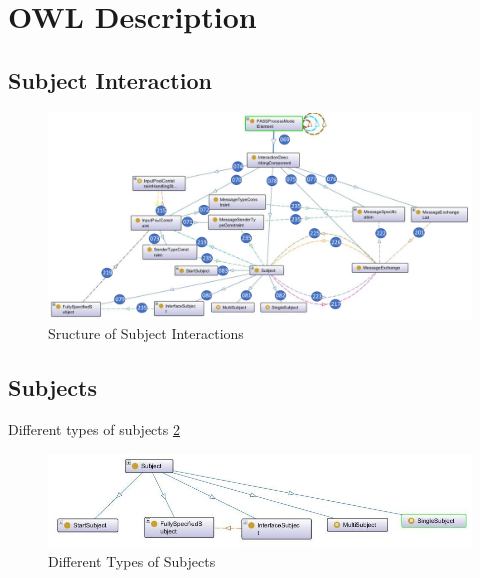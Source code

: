 \newpage

\section{OWL Description}

\subsection{Subject Interaction}

\begin{figure}[ph]
	\centering
	\includegraphics[width=16cm]{20181026-Ontologie-Bilder/Grafiken-Ontologie/SUbject-Interaction/OntoGrSubjectInteraction}
	\caption[Sructure of Subject Interactions]{Sructure of Subject Interactions}
	\label{fig:ontogrsubjectinteraction}
\end{figure}







\newpage

\subsection{Subjects}

Different types of subjects \ref{fig:20181205-subject}
\begin{figure}[ph]
	\centering
	\includegraphics[width=0.9\linewidth]{20181026-Ontologie-Bilder/Grafiken-Ontologie/SUbject-Interaction/20181205-Subject}
	\caption[Subject]{Different Types of Subjects}
	\label{fig:20181205-subject}
\end{figure}

